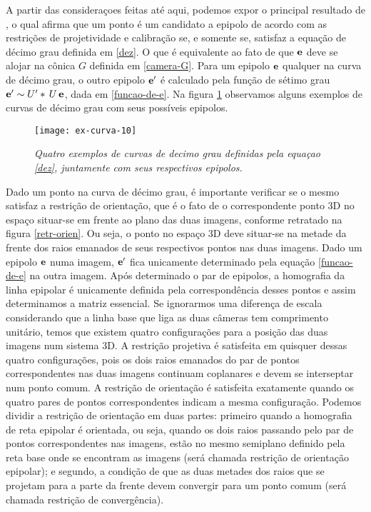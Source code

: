 A partir das consideraçoes feitas até aqui, podemos expor o principal resultado de \cite{kneebone}, o qual afirma que um ponto é um candidato a epipolo de acordo com as restrições de projetividade e calibração se, e somente se, satisfaz a equação de décimo grau definida em \ref{dez}. O que é equivalente ao fato de que ${\bf e}$ deve se alojar na cônica $G$ definida em \ref{camera-G}. Para um epipolo ${\bf e}$ qualquer na curva de décimo grau, o outro epipolo ${\bf e'}$ é calculado pela função de sétimo grau ${\bf e'} \sim U'*\,U\,{\bf e}$, dada em \ref{funcao-de-e}. Na figura \ref{curva-10} observamos alguns exemplos de curvas de décimo grau com seus possíveis epipolos. 

\begin{figure}[!htb]
\centering
\texttt{[image: ex-curva-10]}
\caption{\textit{Quatro exemplos de curvas de decimo grau definidas pela equaçao \ref{dez}, juntamente com seus respectivos epipolos.}}
\label{curva-10}
\end{figure}

Dado um ponto na curva de décimo grau, é importante verificar se o mesmo satisfaz a restrição de orientação, que é o fato de o correspondente ponto 3D no espaço situar-se em frente ao plano das duas imagens, conforme retratado na figura \ref{retr-orien}. Ou seja, o ponto no espaço 3D deve situar-se na metade da frente dos raios emanados de seus respectivos pontos nas duas imagens. Dado um epipolo ${\bf e}$ numa imagem, ${\bf e'}$ fica unicamente determinado pela equação \ref{funcao-de-e} na outra imagem. Após determinado o par de epipolos, a homografia da linha epipolar é unicamente definida pela correspondência desses pontos e assim determinamos a matriz essencial. Se ignorarmos uma diferença de escala considerando que a linha base que liga as duas câmeras tem comprimento unitário, temos que existem quatro configurações para a posição das duas imagens num sistema 3D. A restrição projetiva é satisfeita em quisquer dessas quatro configurações, pois os dois raios emanados do par de pontos correspondentes nas duas imagens continuam coplanares e devem se interseptar num ponto comum. A restrição de orientação é satisfeita exatamente quando os quatro pares de pontos correspondentes indicam a mesma configuração. Podemos dividir a restrição de orientação em duas partes: primeiro quando a homografia de reta epipolar é orientada, ou seja, quando os dois raios passando pelo par de pontos correspondentes nas imagens, estão no mesmo semiplano definido pela reta base onde se encontram as imagens (será chamada restrição de orientação epipolar); e segundo, a condição de que as duas metades dos raios que se projetam para a parte da frente devem convergir para um ponto comum (será chamada restrição de convergência).  

